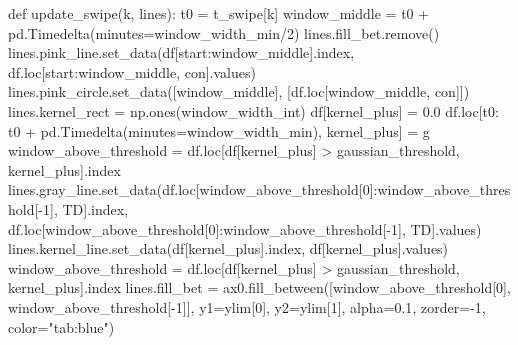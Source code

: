 \documentclass[
  letterpaper,
  DIV=11,
  numbers=noendperiod,
  oneside]{scrreprt}
\newenvironment{Shaded}{\begin{snugshade}}{\end{snugshade}}
\newcommand{\DecValTok}[1]{\textcolor[rgb]{0.68,0.00,0.00}{#1}}
\newcommand{\FloatTok}[1]{\textcolor[rgb]{0.68,0.00,0.00}{#1}}
\newcommand{\KeywordTok}[1]{\textcolor[rgb]{0.00,0.23,0.31}{#1}}
\newcommand{\NormalTok}[1]{\textcolor[rgb]{0.00,0.23,0.31}{#1}}
\newcommand{\OperatorTok}[1]{\textcolor[rgb]{0.37,0.37,0.37}{#1}}
\newcommand{\StringTok}[1]{\textcolor[rgb]{0.13,0.47,0.30}{#1}}
\begin{document}
\begin{Shaded}
\begin{Highlighting}[]
\KeywordTok{def}\NormalTok{ update\_swipe(k, lines):}
\NormalTok{    t0 }\OperatorTok{=}\NormalTok{ t\_swipe[k]}
\NormalTok{    window\_middle }\OperatorTok{=}\NormalTok{ t0 }\OperatorTok{+}\NormalTok{ pd.Timedelta(minutes}\OperatorTok{=}\NormalTok{window\_width\_min}\OperatorTok{/}\DecValTok{2}\NormalTok{)}
\NormalTok{    lines.fill\_bet.remove()}
\NormalTok{    lines.pink\_line.set\_data(df[start:window\_middle].index,}
\NormalTok{                             df.loc[start:window\_middle, }\StringTok{\textquotesingle{}con\textquotesingle{}}\NormalTok{].values)}
\NormalTok{    lines.pink\_circle.set\_data([window\_middle], [df.loc[window\_middle, }\StringTok{\textquotesingle{}con\textquotesingle{}}\NormalTok{]])}
\NormalTok{    lines.kernel\_rect }\OperatorTok{=}\NormalTok{ np.ones(window\_width\_int)}
\NormalTok{    df[}\StringTok{\textquotesingle{}kernel\_plus\textquotesingle{}}\NormalTok{] }\OperatorTok{=} \FloatTok{0.0}
\NormalTok{    df.loc[t0: t0 }\OperatorTok{+}\NormalTok{ pd.Timedelta(minutes}\OperatorTok{=}\NormalTok{window\_width\_min), }\StringTok{\textquotesingle{}kernel\_plus\textquotesingle{}}\NormalTok{] }\OperatorTok{=}\NormalTok{ g}
\NormalTok{    window\_above\_threshold }\OperatorTok{=}\NormalTok{ df.loc[df[}\StringTok{\textquotesingle{}kernel\_plus\textquotesingle{}}\NormalTok{] }\OperatorTok{\textgreater{}}\NormalTok{ gaussian\_threshold, }\StringTok{\textquotesingle{}kernel\_plus\textquotesingle{}}\NormalTok{].index}
\NormalTok{    lines.gray\_line.set\_data(df.loc[window\_above\_threshold[}\DecValTok{0}\NormalTok{]:window\_above\_threshold[}\OperatorTok{{-}}\DecValTok{1}\NormalTok{], }\StringTok{\textquotesingle{}TD\textquotesingle{}}\NormalTok{].index,}
\NormalTok{                             df.loc[window\_above\_threshold[}\DecValTok{0}\NormalTok{]:window\_above\_threshold[}\OperatorTok{{-}}\DecValTok{1}\NormalTok{], }\StringTok{\textquotesingle{}TD\textquotesingle{}}\NormalTok{].values)}
\NormalTok{    lines.kernel\_line.set\_data(df[}\StringTok{\textquotesingle{}kernel\_plus\textquotesingle{}}\NormalTok{].index, df[}\StringTok{\textquotesingle{}kernel\_plus\textquotesingle{}}\NormalTok{].values)}
\NormalTok{    window\_above\_threshold }\OperatorTok{=}\NormalTok{ df.loc[df[}\StringTok{\textquotesingle{}kernel\_plus\textquotesingle{}}\NormalTok{] }\OperatorTok{\textgreater{}}\NormalTok{ gaussian\_threshold, }\StringTok{\textquotesingle{}kernel\_plus\textquotesingle{}}\NormalTok{].index}
\NormalTok{    lines.fill\_bet }\OperatorTok{=}\NormalTok{ ax0.fill\_between([window\_above\_threshold[}\DecValTok{0}\NormalTok{], window\_above\_threshold[}\OperatorTok{{-}}\DecValTok{1}\NormalTok{]],}
\NormalTok{                                       y1}\OperatorTok{=}\NormalTok{ylim[}\DecValTok{0}\NormalTok{], y2}\OperatorTok{=}\NormalTok{ylim[}\DecValTok{1}\NormalTok{], alpha}\OperatorTok{=}\FloatTok{0.1}\NormalTok{, zorder}\OperatorTok{={-}}\DecValTok{1}\NormalTok{, color}\OperatorTok{=}\StringTok{"tab:blue"}\NormalTok{)}


\end{Highlighting}
\end{Shaded}
\end{document}
